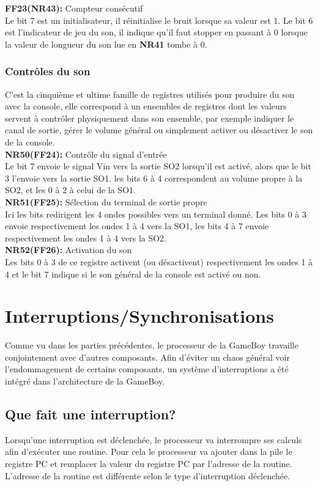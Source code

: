 \documentclass{report}
\begin{document}
	\textbf{FF23(NR43):} Compteur consécutif\\
		Le bit 7 est un initialisateur, il réinitialise le bruit
		lorsque sa valeur est 1.
		Le bit 6 est l'indicateur de jeu du son, il indique
		qu'il faut stopper en passant à 0 lorsque la valeur de
		longueur du son lue en \textbf{NR41} tombe à 0. 
	\subsubsection{Contrôles du son}
		C'est la cinquième et ultime famille de registres
		utilisés pour produire du son avec la console, elle
		correspond à un ensembles de registres dont les
		valeurs servent à contrôler physiquement dans son
		ensemble, par exemple indiquer le canal de sortie,
		gérer le volume général ou simplement activer ou
		désactiver le son de la console. \\

	\textbf{NR50(FF24):} Contrôle du signal d'entrée \\ 
		Le bit 7 envoie le signal Vin vers la sortie SO2
		lorsqu'il est activé, alors que le bit 3 l'envoie vers
		la sortie SO1. les bits 6 à 4 correspondent au volume
		propre à la SO2, et les 0 à 2 à celui de la SO1. \\

	\textbf{NR51(FF25):} Sélection du terminal de sortie propre \\
		Ici les bits redirigent les 4 ondes possibles vers un
		terminal donné.
		Les bits 0 à 3 envoie respectivement les ondes 1 à 4
		vers la SO1, les bits 4 à 7 envoie respectivement les
		ondes 1 à 4 vers la SO2.\\

	\textbf{NR52(FF26):} Activation du son \\
		Les bits 0 à 3 de ce registre activent (ou
		désactivent) respectivement les ondes 1 à 4 et le bit
		7 indique si le son général de la console est activé
		ou non.
\section{Interruptions/Synchronisations}
Comme vu dans les parties précédentes, le processeur de la GameBoy travaille conjointement avec d'autres composants. Afin d'éviter un chaos général voir l'endommagement de certains composants, un système d'interruptions a été intégré dans l'architecture de la GameBoy.
\subsection{Que fait une interruption?}
Lorsqu'une interruption est déclenchée, le processeur va interrompre ses calculs afin d'exécuter une routine. Pour cela le processeur va ajouter dans la pile le registre PC et remplacer la valeur du registre PC par l'adresse de la routine. L'adresse de la routine est différente selon le type d'interruption déclenchée.
\end{document}

